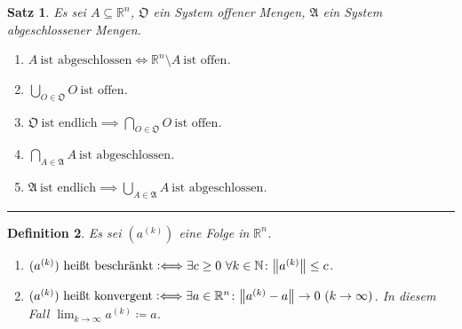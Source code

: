 \documentclass[a4paper]{article}
\newcounter{Sec}
\theoremstyle{marginbreak}
\newtheorem{definition}{Definition}[Sec]
\newtheorem{satz}[definition]{Satz}
\newcommand{\sep}{%
	\rule{\textwidth}{0.3pt}%
	\stepcounter{Sec}%
	}
\newcommand{\defiff}{\mathrel{\vcentcolon\Longleftrightarrow}}
\begin{document}
	\begin{satz}
		Es sei $A\subseteq \mathbb{R}^n$, $\mathfrak{O}$ ein System offener Mengen,
		$\mathfrak{A}$ ein System abgeschlossener Mengen.
		\begin{enumerate}[label=(\alph*)]
			\item $A\ \text{ist abgeschlossen}\iff \mathbb{R}^n\setminus A\ \text{ist offen}$.
			\item $\bigcup_{O\in\mathfrak{O}}O\ \text{ist offen}$.
			\item $\mathfrak{O}\ \text{ist endlich}\implies\bigcap_{O\in\mathfrak{O}}O\ \text{ist offen}$.
			\item $\bigcap_{A\in\mathfrak{A}}A\ \text{ist abgeschlossen}$.
			\item $\mathfrak{A}\ \text{ist endlich}\implies\bigcup_{A\in\mathfrak{A}}A\ \text{ist abgeschlossen}$.
		\end{enumerate}
	\end{satz}
	\sep
	\begin{definition}
		Es sei $(a^{(k)})$ eine Folge in $\mathbb{R}^n$.
		\begin{enumerate}[label=(\alph*)]
			\item $(a^{(k)})\ \text{heißt beschränkt}\defiff\exists c\geq 0\ \forall k\in\mathbb{N}\colon \norm{a^{(k)}}\leq c$.
			\item $(a^{(k)})\ \text{heißt konvergent}\defiff\exists a\in\mathbb{R}^n\colon \norm{a^{(k)}-a}\to 0\ (k\to\infty)$.
				In diesem Fall $\lim_{k\to\infty} a^{(k)}\coloneqq a$.
		\end{enumerate}
	\end{definition}
\end{document}
